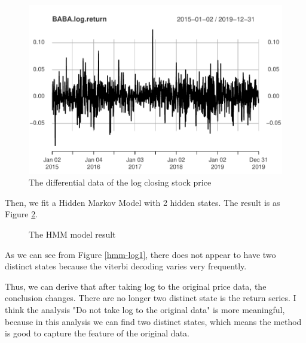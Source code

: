 \documentclass{article}
\begin{document}
\begin{figure}[H]
    \centering
    \includegraphics[width=0.7\linewidth]{images/differential2}
    \caption{The differential data of the log closing stock price}
    \label{differential2}
\end{figure}
Then, we fit a Hidden Markov Model with 2 hidden states. The result is as Figure \ref{hmm-log}.
\begin{figure}[H]
    \centering
    \quad
    \caption{The HMM model result}
    \label{hmm-log}
\end{figure}
As we can see from Figure \ref{hmm-log1}, there does not appear to have two distinct states because the viterbi decoding varies very frequently.

\vspace{4pt}
Thus, we can derive that after taking log to the original price data, the conclusion changes. There are no longer two distinct state is the return series. I think the analysis "Do not take log to the original data" is more meaningful, 
because in this analysis we can find two distinct states, which means the method is good to capture the feature of the original data.
\end{document}
